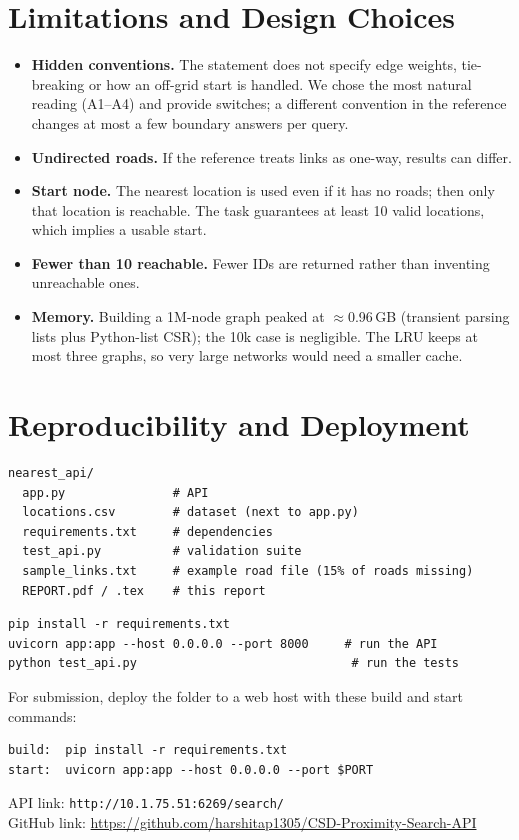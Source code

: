 \documentclass[11pt,a4paper]{article}
\newcommand{\code}[1]{\texttt{#1}}
\begin{document}
\section{Limitations and Design Choices}
\begin{itemize}
\item \textbf{Hidden conventions.} The statement does not specify edge weights, tie-breaking or how an off-grid start is handled. We chose
 the most natural reading (A1--A4) and provide switches; a different convention in the reference changes at most a few boundary answers per query.
\item \textbf{Undirected roads.} If the reference treats links as one-way, results can differ.
\item \textbf{Start node.} The nearest location is used even if it has no roads; then only that location is reachable. The task guarantees
 at least 10 valid locations, which implies a usable start.
\item \textbf{Fewer than 10 reachable.} Fewer IDs are returned rather than inventing unreachable ones.
\item \textbf{Memory.} Building a 1M-node graph peaked at $\approx$0.96\,GB (transient parsing lists plus Python-list CSR); the 10k case is negligible. The LRU keeps at most three graphs, so very large networks would need a smaller cache.
\end{itemize}

\section{Reproducibility and Deployment}
\noindent\begin{minipage}{\linewidth}
\begin{lstlisting}
nearest_api/
  app.py               # API
  locations.csv        # dataset (next to app.py)
  requirements.txt     # dependencies
  test_api.py          # validation suite
  sample_links.txt     # example road file (15% of roads missing)
  REPORT.pdf / .tex    # this report
\end{lstlisting}
\end{minipage}\par\smallskip
\noindent\begin{minipage}{\linewidth}
\begin{lstlisting}
pip install -r requirements.txt
uvicorn app:app --host 0.0.0.0 --port 8000     # run the API
python test_api.py                              # run the tests
\end{lstlisting}
\end{minipage}\par\smallskip
For submission, deploy the folder to a web host with these build and start commands:
\begin{lstlisting}
build:  pip install -r requirements.txt
start:  uvicorn app:app --host 0.0.0.0 --port $PORT
\end{lstlisting}
API link: \code{http://10.1.75.51:6269/search/}\\
GitHub link: \url{https://github.com/harshitap1305/CSD-Proximity-Search-API}
\end{document}
